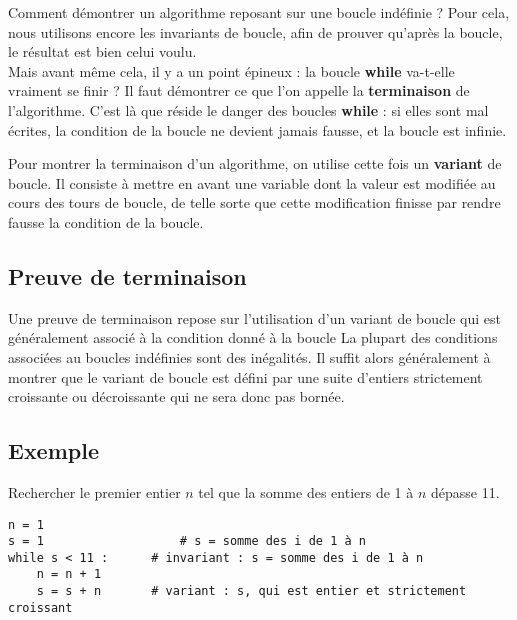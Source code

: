 Comment démontrer un 
algorithme reposant sur une boucle indéfinie ? Pour cela, nous utilisons encore les invariants de 
boucle, afin de prouver qu'après la boucle, le résultat est bien celui voulu.\\
Mais avant même cela, il y a un point épineux : la boucle \textbf{while} va-t-elle vraiment se 
finir ? Il faut démontrer ce que l'on appelle la \textbf{terminaison} de l'algorithme. C'est là que 
réside le danger des boucles \textbf{while} : si elles sont mal écrites, la condition de la boucle 
ne devient jamais fausse, et la boucle est infinie.\\

\begin{defi}
Pour montrer la terminaison d'un algorithme, on utilise cette fois un \textbf{variant} de boucle. 
Il consiste à mettre en avant une variable dont la valeur est modifiée au cours des tours de 
boucle, de telle sorte que cette modification finisse par rendre fausse la condition de la boucle.\\
\end{defi}


\subsection{Preuve de terminaison}


\begin{defi}
Une preuve de terminaison repose sur l'utilisation d'un variant de boucle qui est généralement associé à la condition donné à la boucle  La plupart des conditions associées au boucles indéfinies sont des inégalités. Il suffit alors généralement à montrer que le variant de boucle est défini par une suite d'entiers strictement croissante ou décroissante qui ne sera donc pas bornée.
\end{defi}

\subsection{Exemple}


\begin{exemple}
Rechercher le premier entier $n$ tel que la somme des entiers de 1 à $n$ dépasse 11.

\begin{lstlisting}
n = 1
s = 1           		# s = somme des i de 1 à n
while s < 11 :  	# invariant : s = somme des i de 1 à n
    n = n + 1
    s = s + n   	# variant : s, qui est entier et strictement croissant
\end{lstlisting}
\end{exemple}